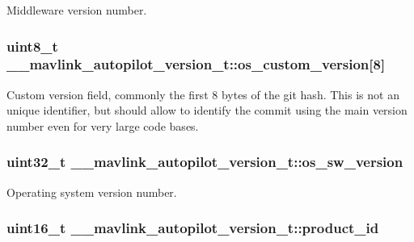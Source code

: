 Middleware version number. 

\hypertarget{struct____mavlink__autopilot__version__t_a4fcb5af0d12a8ea812dc34e53398638b}{
\subsubsection[{os\+\_\+custom\+\_\+version}]{\setlength{\rightskip}{0pt plus 5cm}uint8\+\_\+t \+\_\+\+\_\+mavlink\+\_\+autopilot\+\_\+version\+\_\+t\+::os\+\_\+custom\+\_\+version\mbox{[}8\mbox{]}}}\label{struct____mavlink__autopilot__version__t_a4fcb5af0d12a8ea812dc34e53398638b}


Custom version field, commonly the first 8 bytes of the git hash. This is not an unique identifier, but should allow to identify the commit using the main version number even for very large code bases. 

\hypertarget{struct____mavlink__autopilot__version__t_a686bf3eff327a4e617e512bc141d7206}{
\subsubsection[{os\+\_\+sw\+\_\+version}]{\setlength{\rightskip}{0pt plus 5cm}uint32\+\_\+t \+\_\+\+\_\+mavlink\+\_\+autopilot\+\_\+version\+\_\+t\+::os\+\_\+sw\+\_\+version}}\label{struct____mavlink__autopilot__version__t_a686bf3eff327a4e617e512bc141d7206}


Operating system version number. 

\hypertarget{struct____mavlink__autopilot__version__t_a7804efd34f81fc1b0946612a418a924b}{
\subsubsection[{product\+\_\+id}]{\setlength{\rightskip}{0pt plus 5cm}uint16\+\_\+t \+\_\+\+\_\+mavlink\+\_\+autopilot\+\_\+version\+\_\+t\+::product\+\_\+id}}\label{struct____mavlink__autopilot__version__t_a7804efd34f81fc1b0946612a418a924b}


